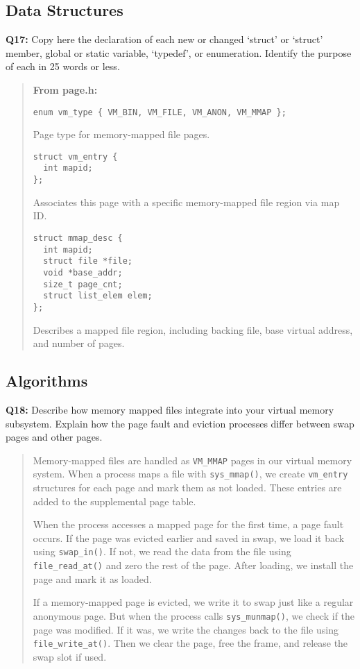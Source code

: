 \documentclass[a4paper,11pt]{paper}
\begin{document}
\subsection{Data Structures}

\textbf{Q17:} Copy here the declaration of each new or changed `struct' or `struct' member, global or static variable, `typedef', or enumeration.  Identify the purpose of each in 25 words or less.
\begin{quote}
\textbf{From page.h:}
\begin{verbatim}
enum vm_type { VM_BIN, VM_FILE, VM_ANON, VM_MMAP };
\end{verbatim}
Page type for memory-mapped file pages.

\begin{verbatim}
struct vm_entry {
  int mapid;
};
\end{verbatim}
Associates this page with a specific memory-mapped file region via map ID.

\begin{verbatim}
struct mmap_desc {
  int mapid;
  struct file *file;
  void *base_addr;
  size_t page_cnt;
  struct list_elem elem;
};
\end{verbatim}
Describes a mapped file region, including backing file, base virtual address, and number of pages.
\end{quote}


\subsection{Algorithms}

\textbf{Q18:} Describe how memory mapped files integrate into your virtual memory subsystem.  Explain how the page fault and eviction processes differ between swap pages and other pages.
\begin{quote}
Memory-mapped files are handled as \texttt{VM\_MMAP} pages in our virtual memory system. When a process maps a file with \texttt{sys\_mmap()}, we create \texttt{vm\_entry} structures for each page and mark them as not loaded. These entries are added to the supplemental page table.

When the process accesses a mapped page for the first time, a page fault occurs. If the page was evicted earlier and saved in swap, we load it back using \texttt{swap\_in()}. If not, we read the data from the file using \texttt{file\_read\_at()} and zero the rest of the page. After loading, we install the page and mark it as loaded.

If a memory-mapped page is evicted, we write it to swap just like a regular anonymous page. But when the process calls \texttt{sys\_munmap()}, we check if the page was modified. If it was, we write the changes back to the file using \texttt{file\_write\_at()}. Then we clear the page, free the frame, and release the swap slot if used.
\end{quote}
\end{document}
